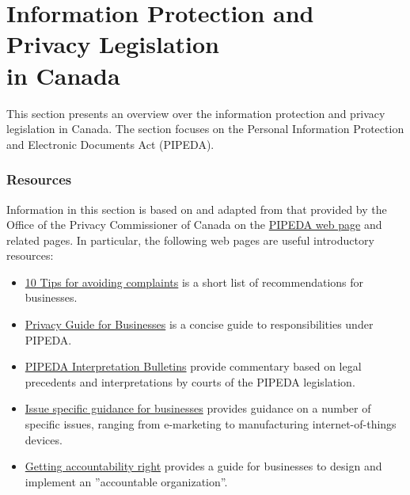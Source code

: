 \section{Information Protection and Privacy Legislation\\ in Canada}
\label{sec:privacy}

This section presents an overview over the information protection and privacy legislation in Canada. The section focuses on the Personal Information Protection and Electronic Documents Act (PIPEDA).

\begin{tcolorbox}[colback=alert]
\subsubsection*{Resources}
Information in this section is based on and adapted from that provided by the Office of the Privacy Commissioner of Canada on the \href{https://www.priv.gc.ca/en/privacy-topics/privacy-laws-in-canada/the-personal-information-protection-and-electronic-documents-act-pipeda/p_principle/}{PIPEDA web page} and related pages. In particular, the following web pages are useful introductory resources:
\begin{itemize}
   \item \href{https://www.priv.gc.ca/en/privacy-topics/privacy-laws-in-canada/the-personal-information-protection-and-electronic-documents-act-pipeda/pipeda-compliance-help/02_05_d_55_tips/}{10 Tips for avoiding complaints} is a short list of recommendations for businesses. 
   \item \href{https://www.priv.gc.ca/media/2038/guide_org_e.pdf}{Privacy Guide for Businesses} is a concise guide to responsibilities under PIPEDA.
   \item \href{https://www.priv.gc.ca/en/privacy-topics/privacy-laws-in-canada/the-personal-information-protection-and-electronic-documents-act-pipeda/pipeda-compliance-help/pipeda-interpretation-bulletins/}{PIPEDA Interpretation Bulletins} provide commentary based on legal precedents and interpretations by courts of the PIPEDA legislation.
   \item \href{https://www.priv.gc.ca/en/privacy-topics/privacy-laws-in-canada/the-personal-information-protection-and-electronic-documents-act-pipeda/pipeda-compliance-help/issue-specific-guidance-for-businesses/}{Issue specific guidance for businesses} provides guidance on a number of specific issues, ranging from e-marketing to manufacturing internet-of-things devices.
   \item \href{https://www.priv.gc.ca/en/privacy-topics/privacy-laws-in-canada/the-personal-information-protection-and-electronic-documents-act-pipeda/pipeda-compliance-help/pipeda-compliance-and-training-tools/gl_acc_201204/}{Getting accountability right} provides a guide for businesses to design and implement an ''accountable organization''. 
\end{itemize}
\end{tcolorbox}

